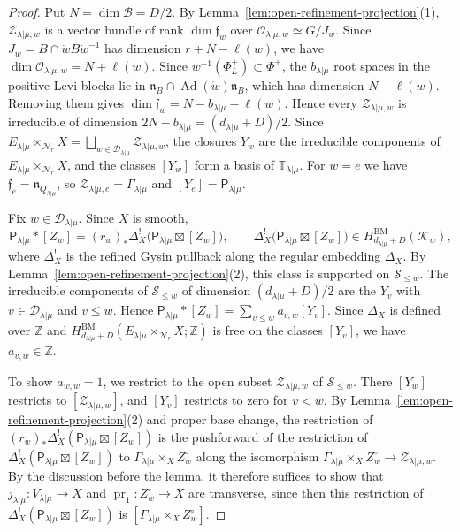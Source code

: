 \documentclass[11pt,a4paper]{amsart}
\theoremstyle{definition}
\theoremstyle{remark}
\newcommand{\N}{\mathcal N}
\newcommand{\B}{\mathcal B}
\newcommand{\bT}{\mathbb T}
\newcommand{\BM}{\mathrm{BM}}
\newcommand{\Ad}{\operatorname{Ad}}
\newcommand{\pr}{\operatorname{pr}}
\newcommand{\lm}{\lambda|\mu}
\numberwithin{equation}{section}
\begin{document}
\begin{proof}
Put $N=\dim\B=D/2$. By Lemma~\ref{lem:open-refinement-projection}(1),
$\mathscr Z_{\lm,w}$ is a vector bundle of rank $\dim\mathfrak f_w$ over
$\mathcal O_{\lm,w}\simeq G/J_w$. Since $J_w=B\cap\dot wB\dot w^{-1}$ has
dimension $r+N-\ell(w)$, we have $\dim\mathcal O_{\lm,w}=N+\ell(w)$. Since
$w^{-1}(\Phi_L^+)\subset\Phi^+$, the $b_{\lm}$ root spaces in the positive
Levi blocks lie in $\mathfrak n_B\cap\Ad(\dot w)\mathfrak n_B$, which has
dimension $N-\ell(w)$. Removing them gives
$\dim\mathfrak f_w=N-b_{\lm}-\ell(w)$. Hence every $\mathscr Z_{\lm,w}$ is
irreducible of dimension $2N-b_{\lm}=(d_{\lm}+D)/2$. Since
$E_{\lm}\times_{\N_r}X=\bigsqcup_{w\in\mathcal D_{\lm}}\mathscr Z_{\lm,w}$,
the closures $Y_w$ are the irreducible components of
$E_{\lm}\times_{\N_r}X$, and the classes $[Y_w]$ form a basis of
$\bT_{\lm}$. For $w=e$ we have $\mathfrak f_e=\mathfrak n_{Q_{\lm}}$, so
$\mathscr Z_{\lm,e}=\Gamma_{\lm}$ and $[Y_e]=\mathsf P_{\lm}$.

Fix $w\in\mathcal D_{\lm}$. Since $X$ is smooth,
$$
\mathsf P_{\lm}*[Z_w]=(r_w)_*\Delta_X^!\bigl(\mathsf P_{\lm}\boxtimes [Z_w]\bigr),
\qquad
\Delta_X^!\bigl(\mathsf P_{\lm}\boxtimes [Z_w]\bigr)
\in H^{\BM}_{d_{\lm}+D}(\mathscr K_w),
$$
where $\Delta_X^!$ is the refined Gysin pullback along the regular
embedding $\Delta_X$. By
Lemma~\ref{lem:open-refinement-projection}(2), this class is supported on
$\mathscr S_{\le w}$. The irreducible components of $\mathscr S_{\le w}$
of dimension $(d_{\lm}+D)/2$ are the $Y_v$ with $v\in\mathcal D_{\lm}$ and
$v\le w$. Hence $\mathsf P_{\lm}*[Z_w]=\sum_{v\le w}a_{v,w}[Y_v]$. Since
$\Delta_X^!$ is defined over $\mathbb Z$ and
$H^{\BM}_{d_{\lm}+D}(E_{\lm}\times_{\N_r}X;\mathbb Z)$ is free on the
classes $[Y_v]$, we have $a_{v,w}\in\mathbb Z$.

To show $a_{w,w}=1$, we restrict to the open subset $\mathscr Z_{\lm,w}$ of
$\mathscr S_{\le w}$. There $[Y_w]$ restricts to $[\mathscr Z_{\lm,w}]$,
and $[Y_v]$ restricts to zero for $v<w$. By
Lemma~\ref{lem:open-refinement-projection}(2) and proper base change, the
restriction of $(r_w)_*\Delta_X^!(\mathsf P_{\lm}\boxtimes [Z_w])$ is the
pushforward of the restriction of $\Delta_X^!(\mathsf P_{\lm}\boxtimes [Z_w])$ to $\Gamma_{\lm}\times_XZ_w^\circ$ along the isomorphism
$\Gamma_{\lm}\times_XZ_w^\circ\to\mathscr Z_{\lm,w}$. By the discussion
before the lemma, it therefore suffices to show that
$j_{\lm}:V_{\lm}\to X$ and $\pr_1:Z_w^\circ\to X$ are transverse, since then
this restriction of $\Delta_X^!(\mathsf P_{\lm}\boxtimes [Z_w])$ is $[\Gamma_{\lm}\times_XZ_w^\circ]$.


\end{proof}
\end{document}
